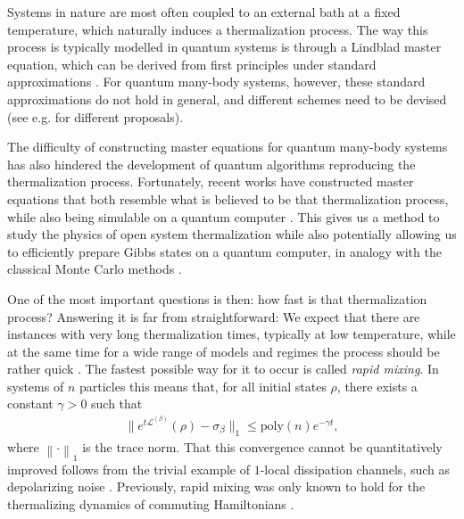 \documentclass[aps,pra,amsmath,amssymb,twocolumn,10pt]{revtex4-2}
\theoremstyle{definition}
\newcommand{\norm}[1]{\left\|#1\right\|}
\begin{document}

Systems in nature are most often coupled to an external bath at a fixed temperature, which naturally induces a thermalization process. The way this process is typically modelled in quantum systems is through a Lindblad master equation, which can be derived from first principles under standard approximations \cite{Rivas_2012}. 
For quantum many-body systems, however, these standard approximations do not hold in general, and different schemes need to be devised (see e.g. \cite{Taj_2008,Mozgunov_2020,Nathan_2020} for different proposals). 

The difficulty of constructing master equations for quantum many-body systems has also hindered the development of quantum algorithms reproducing the thermalization process. Fortunately, recent works \cite{chen2023quantumthermalstatepreparation,chen2023efficient} have constructed master equations that both resemble what is believed to be that thermalization process, while also being simulable on a quantum computer \cite{ding2024efficientquantumgibbssamplers,gilyen2024quantumgeneralizationsglaubermetropolis}. This gives us a method to study the physics of open system thermalization \cite{kastoryano2024littlebitselfcorrection,dabbruzzo2024steadystateentanglementscalingopen} while also potentially allowing us to efficiently prepare Gibbs states on a quantum computer, in analogy with the classical Monte Carlo methods \cite{levin2017markov}. 

One of the most important questions is then: how fast is that thermalization process? Answering it is far from straightforward: We expect that there are instances with very long thermalization times, typically at low temperature, while at the same time for a wide range of models and regimes the process should be rather quick \cite{martinelli1999lectures,kastoryano2016quantum,bardet2023rapid,bardet2024entropy}. The fastest possible way for it to occur is called \emph{rapid mixing}. In systems of $n$ particles this means that, for all initial states $\rho$, there exists a constant $\gamma >0$ such that
\begin{align}\label{equ:rapid_mixing}
   \|e^{t\mathcal{L}^{(\beta)}}(\rho)-\sigma_\beta\|_1 \le \text{poly}(n) e^{-\gamma t},
\end{align}
where $\norm{\cdot}_1$ is the trace norm.
That this convergence cannot be quantitatively improved follows from the trivial example of $1$-local dissipation channels, such as depolarizing noise \cite{depolarizing2016}. Previously, rapid mixing was only known to hold for the thermalizing dynamics of commuting Hamiltonians \cite{Majewski1995,temme2015fast,bardet2023rapid,bardet2024entropy,kochanowski2024rapidthermalizationdissipativemanybody}.
\end{document}
